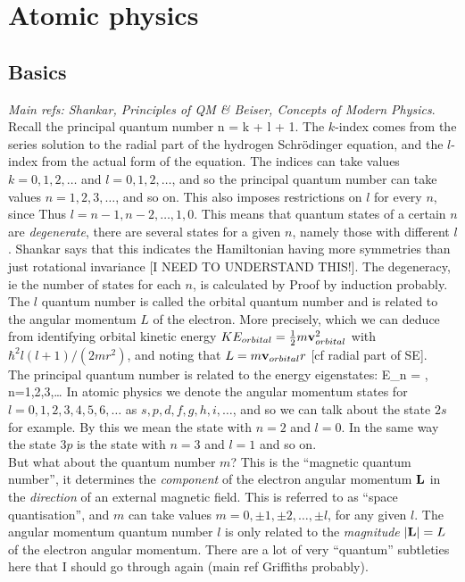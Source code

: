 \section{Atomic physics}
\subsection{Basics}
\emph{Main refs: Shankar, Principles of QM \& Beiser, Concepts of Modern Physics}.\\
Recall the principal quantum number
    {
      n = k + l + 1.
      }
    The $k$-index comes from the series solution to the radial part of the hydrogen Schrödinger equation, and the $l$-index from the actual form of the equation. The indices can take values $k=0,1,2,\dots$ and $l=0,1,2,\dots$, and so the principal quantum number can take values $n=1,2,3,\dots$, and so on. This also imposes restrictions on $l$ for every $n$, since
    Thus $l = n-1,n-2,\dots,1,0$. This means that quantum states of a certain $n$ are \emph{degenerate}, there are several states for a given $n$, namely those with different $l$. Shankar says that this indicates the Hamiltonian having more symmetries than just rotational invariance [I NEED TO UNDERSTAND THIS!]. The degeneracy, ie the number of states for each $n$, is calculated by
    Proof by induction probably. The $l$ quantum number is called the orbital quantum number and is related to the angular momentum $L$ of the electron. More precisely,
    which we can deduce from identifying orbital kinetic energy $KE_{orbital} = \frac{1}{2}m\mathbf{v}_{orbital}^2$ with $\hbar^2l(l+1)/(2mr^2)$, and noting that $L = m\mathbf{v}_{orbital}r$ [cf radial part of SE].\\
\indent The principal quantum number is related to the energy eigenstates:
    {
      E_n = , \hspace{5pt} n=1,2,3,\dots
      }
    In atomic physics we denote the angular momentum states for $l=0,1,2,3,4,5,6,\dots$ as $s,p,d,f,g,h,i,\dots$, and so we can talk about the state $2s$ for example. By this we mean the state with $n=2$ and $l=0$. In the same way the state $3p$ is the state with $n=3$ and $l=1$ and so on.\\
    \indent But what about the quantum number $m$? This is the ``magnetic quantum number'', it determines the \emph{component} of the electron angular momentum $\mathbf{L}$ in the \emph{direction} of an external magnetic field. This is referred to as ``space quantisation'', and $m$ can take values $m=0,\pm 1,\pm 2,\dots,\pm l$, for any given $l$. The angular momentum quantum number $l$ is only related to the \emph{magnitude} $|\mathbf{L}| = L$ of the electron angular momentum. There are a lot of very ``quantum'' subtleties here that I should go through again (main ref Griffiths probably).\\

